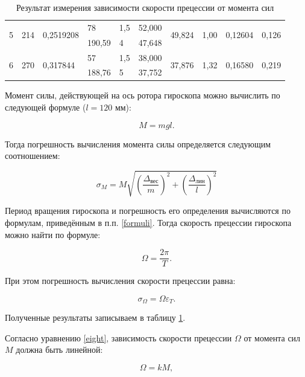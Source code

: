 \begin{table}[H]
\begin{tabular}{|l|l|l|l|l|l|l|l|l|l|}
\multirow{2}{*}{5} & \multirow{2}{*}{214} & \multirow{2}{*}{0,2519208} & 78     & 1,5   & 52,000  & \multirow{2}{*}{49,824}       & \multirow{2}{*}{1,00} & \multirow{2}{*}{0,12604}     & \multirow{2}{*}{0,126}            \\ \cline{4-6}
                   &                      &                            & 190,59 & 4     & 47,648  &                               &                       &                              &                                   \\ \hline\hline
\multirow{2}{*}{6} & \multirow{2}{*}{270} & \multirow{2}{*}{0,317844}  & 57     & 1,5   & 38,000  & \multirow{2}{*}{37,876}       & \multirow{2}{*}{1,32} & \multirow{2}{*}{0,16580}     & \multirow{2}{*}{0,219}            \\ \cline{4-6}
                   &                      &                            & 188,76 & 5     & 37,752  &                               &                       &                              &                                   \\ \hline
\end{tabular}
	\caption{Результат измерения зависимости скорости прецессии от момента сил}
	\label{sk_pre}
\end{table}

    Момент силы, действующей на ось ротора гироскопа можно вычислить по следующей формуле ($l = 120$ мм):

\[
M = mgl.
\]

    Тогда погрешность вычисления момента силы определяется следующим соотношением:

\[
\sigma_M = M\sqrt{\left( \frac{\Delta_\text{вес}}{m} \right)^2 + \left( \frac{\Delta_\text{лин}}{l} \right)^2}
\]

    Период вращения гироскопа и погрешность его определения вычисляются по формулам, приведённым в п.п. \ref{formuli}.
    Тогда скорость прецессии гироскопа можно найти по формуле:

\[
\Omega = \frac{2\pi}{T}.
\]

    При этом погрешность вычисления скорости прецессии равна:
    
\[
\sigma_\Omega = \Omega \varepsilon_T.
\]

    Полученные результаты записываем в таблицу \ref{sk_pre}.

    Согласно уравнению \eqref{eight}, зависимость скорости прецессии $ \Omega $ от момента сил $ M $ должна быть линейной:

\[
\Omega = kM,
\]

